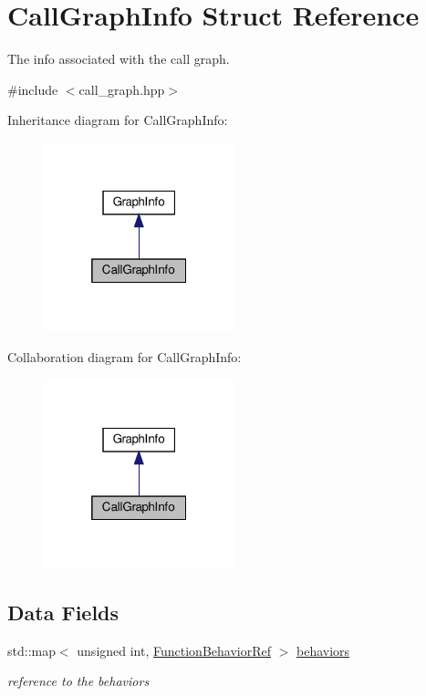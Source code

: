 \hypertarget{structCallGraphInfo}{}\section{Call\+Graph\+Info Struct Reference}
\label{structCallGraphInfo}


The info associated with the call graph.  




{\ttfamily \#include $<$call\+\_\+graph.\+hpp$>$}



Inheritance diagram for Call\+Graph\+Info\+:
\nopagebreak
\begin{figure}[H]
\begin{center}
\leavevmode
\includegraphics[width=157pt]{d1/de2/structCallGraphInfo__inherit__graph}
\end{center}
\end{figure}


Collaboration diagram for Call\+Graph\+Info\+:
\nopagebreak
\begin{figure}[H]
\begin{center}
\leavevmode
\includegraphics[width=157pt]{dc/deb/structCallGraphInfo__coll__graph}
\end{center}
\end{figure}
\subsection*{Data Fields}
\begin{DoxyCompactItemize}
\item 
std\+::map$<$ unsigned int, \hyperlink{function__behavior_8hpp_affbc6a46ab86ddfabe31c10986d333dc}{Function\+Behavior\+Ref} $>$ \hyperlink{structCallGraphInfo_abcc4ddc6fb1603a1d2bd37fc4029cdc3}{behaviors}
\begin{DoxyCompactList}\small\item\em reference to the behaviors \end{DoxyCompactList}\end{DoxyCompactItemize}
